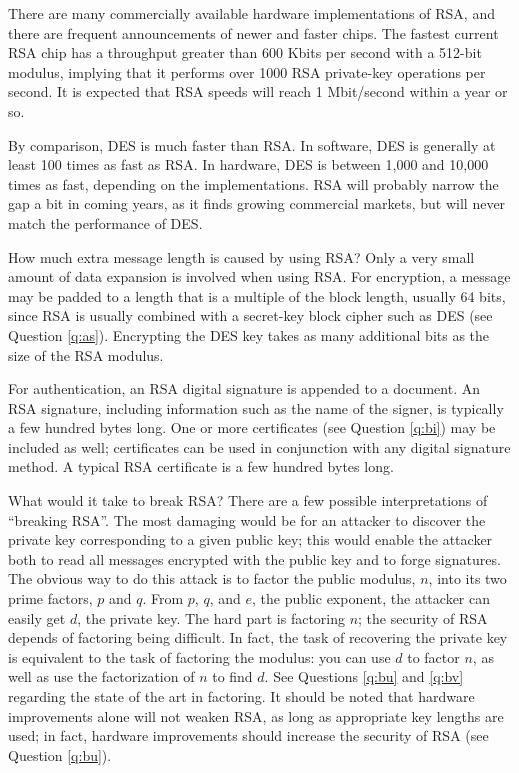 There are many commercially available hardware implementations of RSA, 
and there are frequent announcements of newer and faster chips. The 
fastest current RSA chip \cite{shand-fast-rsa} has a throughput greater 
than 600 Kbits per second with a 512-bit modulus, implying that it performs 
over 1000 RSA private-key operations per second. It is expected that RSA 
speeds will reach 1 Mbit/second within a year or so.

By comparison, DES is much faster than RSA. In software, DES is generally at 
least 100 times as fast as RSA. In hardware, DES is between 1,000 and 10,000
times as fast, depending on the implementations. RSA will probably 
narrow the gap a bit in coming years, as it finds growing commercial
markets, but will never match the performance of DES.

{How much extra message length is caused by using RSA?}
Only a very small amount of data expansion is involved when using RSA. For 
encryption, a message may be padded to a length that is a multiple of the 
block length, usually 64 bits, since RSA is usually combined with 
a secret-key block cipher such as DES (see Question \ref{q:as}). Encrypting 
the DES key takes as many additional bits as the size of the RSA modulus.


For authentication, an RSA digital signature is appended to a document.
An RSA signature, including information such as the name of the signer, is 
typically a few hundred bytes long. One or more certificates (see Question 
\ref{q:bi}) may be included as well; certificates can be used in conjunction
with any digital signature method. A typical RSA certificate is a few 
hundred bytes long.

{What would it take to break RSA?}
There are a few possible interpretations of ``breaking RSA''. The most 
damaging would be for an attacker to discover the private key corresponding 
to a given public key; this would enable the attacker both to read all 
messages encrypted with the public key and to forge signatures. The obvious 
way to do this attack is to factor the public modulus, $n$, into its two prime
factors, $p$ and $q$. From $p$, $q$, and $e$, the public exponent, the 
attacker can easily get $d$, the private key. The hard part is factoring $n$; 
the security of RSA depends of factoring being difficult. In fact, the task 
of recovering the private key is equivalent to the task of factoring the 
modulus: you can use $d$ to factor $n$, as well as use the factorization of 
$n$ to find $d$. See Questions \ref{q:bu} and \ref{q:bv} regarding the state 
of the art in factoring. It should be noted that hardware improvements alone 
will not weaken RSA, as long as appropriate key lengths are used; in fact, 
hardware improvements should increase the security of RSA (see Question 
\ref{q:bu}).

